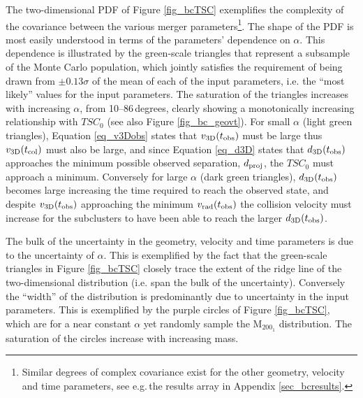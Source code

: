 \documentclass[12pt]{emulateapj}
\begin{document}
The two-dimensional PDF of Figure \ref{fig_bcTSC} exemplifies the complexity of the covariance between the various merger parameters\footnote{Similar degrees of complex covariance exist for the other geometry, velocity and time parameters, see e.g.\,the results array in Appendix \ref{sec_bcresults}.}.
The shape of the PDF is most easily understood in terms of the parameters' dependence on $\alpha$.
This dependence is illustrated by the green-scale triangles that represent a subsample of the Monte Carlo population,  which jointly satisfies the requirement of being drawn from $\pm 0.13 \sigma$ of the mean of each of the input parameters, i.e. the ``most likely'' values for the input parameters.
The saturation of the triangles increases with increasing $\alpha$, from 10--86\,degrees, clearly showing a monotonically increasing relationship with $TSC_0$ (see also Figure \ref{fig_bc_geovt}).
For small $\alpha$ (light green triangles), Equation \ref{eq_v3Dobs} states that $v_{\rm 3D}(t_{\rm obs})$ must be large thus $v_{\rm 3D}(t_{\rm col})$ must also be large, and since Equation \ref{eq_d3D} states that $d_{\rm 3D}(t_{\rm obs})$ approaches the minimum possible observed separation, $d_{\rm proj}$, the $TSC_0$ must approach a minimum.
Conversely for large $\alpha$ (dark green triangles), $d_{\rm 3D}(t_{\rm obs})$ becomes large increasing the time required to reach the observed state, and despite $v_{\rm 3D}(t_{\rm obs})$ approaching the minimum $v_{\rm rad}(t_{\rm obs})$ the collision velocity must increase for the subclusters to have been able to reach the larger $d_{\rm 3D}(t_{\rm obs})$.   

The bulk of the uncertainty in the geometry, velocity and time parameters is due to the uncertainty of $\alpha$.
This is exemplified by the fact that the green-scale triangles in Figure \ref{fig_bcTSC} closely trace the extent of the ridge line of the two-dimensional distribution (i.e. span the bulk of the uncertainty).
Conversely the ``width'' of the distribution is predominantly due to uncertainty in the input parameters.
This is exemplified by the purple circles of Figure \ref{fig_bcTSC}, which are for a near constant $\alpha$ yet randomly sample the M$_{200_1}$ distribution. 
The saturation of the circles increase with increasing mass.
\end{document}
